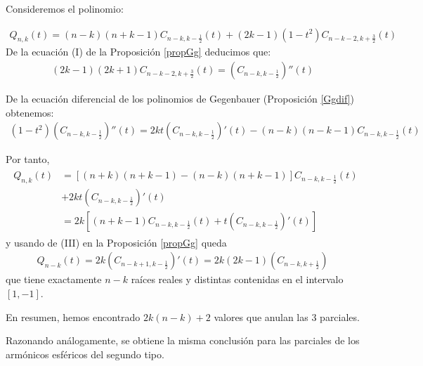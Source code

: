 \medskip

Consideremos el polinomio:

\begin{gather*}
Q_{n,k}(t) =(n-k)(n+k-1)C_{n-k,k-\frac{1}{2}}(t)+(2k-1)(1-t^2)C_{n-k-2,k+\frac{3}{2}}(t)
\end{gather*}
De la ecuación (I) de la Proposición \ref{propGg} deducimos que:
\begin{gather*}
(2k-1)(2k+1)C_{n-k-2,k+\frac{3}{2}}(t) = \left(C_{n-k,k-\frac{1}{2}}\right)'' (t)
\end{gather*}

De la ecuación diferencial de los polinomios de Gegenbauer (Proposición \ref{Ggdif}) obtenemos:
\begin{gather*}
(1-t^2)\left(C_{n-k,k-\frac{1}{2}}\right)'' (t) = 2kt\left(C_{n-k,k-\frac{1}{2}}\right)'(t)-(n-k)(n-k-1)C_{n-k,k-\frac{1}{2}}(t)
\end{gather*}

Por tanto,
\begin{gather*}
\begin{aligned}
Q_{n,k}(t) &= \left[(n+k)(n+k-1)-(n-k)(n+k-1)\right] C_{n-k,k-\frac{1}{2}}(t) \\&+ 2kt\left(C_{n-k,k-\frac{1}{2}}\right)'(t) \\&= 2k\left[(n+k-1)C_{n-k,k-\frac{1}{2}}(t)+ t\left(C_{n-k,k-\frac{1}{2}}\right)'(t)\right]
\end{aligned}
\end{gather*}
y usando de (III) en la Proposición \ref{propGg} queda
\begin{gather*}
Q_{n-k}(t) = 2k\left(C_{n-k+1,k-\frac{1}{2}}\right)'(t)=2k(2k-1)\left(C_{n-k,k+\frac{1}{2}}\right)
\end{gather*}
que tiene exactamente $n-k$ raíces reales y distintas contenidas en el intervalo $[1,-1]$.

En resumen, hemos encontrado $2k(n-k)+2$ valores que anulan las 3 parciales.

\medskip
Razonando análogamente, se obtiene la misma conclusión para las parciales de los armónicos esféricos del segundo tipo.

\medskip

